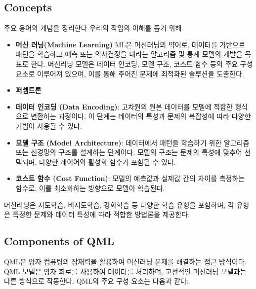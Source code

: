  \subsection{Concepts}
주요 용어와 개념을 정리한다 우리의 작업의 이해를 돕기 위해
\begin{itemize}
    \item \textbf{머신 러닝(Machine Learning)} ML은 머신러닝의 약어로, 데이터를 기반으로 패턴을 학습하고 예측 또는 의사결정을 내리는 알고리즘 및 통계 모델의 개발을 목표로 한다. 머신러닝 모델은 데이터 인코딩, 모델 구조, 코스트 함수 등의 주요 구성 요소로 이루어져 있으며, 이를 통해 주어진 문제에 최적화된 솔루션을 도출한다.

    \item \textbf{퍼셉트론}

    \item \textbf{데이터 인코딩 (Data Encoding)}: 고차원의 원본 데이터를 모델에 적합한 형식으로 변환하는 과정이다. 이 단계는 데이터의 특성과 문제의 복잡성에 따라 다양한 기법이 사용될 수 있다.

    \item \textbf{모델 구조 (Model Architecture)}: 데이터에서 패턴을 학습하기 위한 알고리즘 또는 신경망의 구조를 설계하는 단계이다. 모델의 구조는 문제의 특성에 맞추어 선택되며, 다양한 레이어와 활성화 함수가 포함될 수 있다.

    \item \textbf{코스트 함수 (Cost Function)}: 모델의 예측값과 실제값 간의 차이를 측정하는 함수로, 이를 최소화하는 방향으로 모델이 학습된다.
\end{itemize}

머신러닝은 지도학습, 비지도학습, 강화학습 등 다양한 학습 유형을 포함하며, 각 유형은 특정한 문제와 데이터 특성에 따라 적합한 방법론을 제공한다.

\subsection{Components of QML}
QML은 양자 컴퓨팅의 잠재력을 활용하여 머신러닝 문제를 해결하는 접근 방식이다. QML 모델은 양자 회로를 사용하여 데이터를 처리하며, 고전적인 머신러닝 모델과는 다른 방식으로 작동한다. QML의 주요 구성 요소는 다음과 같다:

